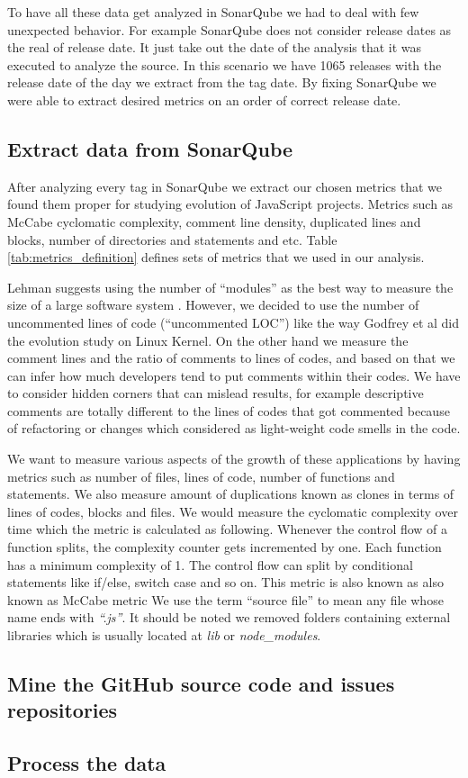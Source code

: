 To have all these data get analyzed in SonarQube we had to deal with few unexpected behavior. For example SonarQube does not consider release dates as the real of release date. It just take out the date of the analysis that it was executed to analyze the source. In this scenario we have 1065 releases with the release date of the day we extract from the tag date. By fixing SonarQube we were able to extract desired metrics on an order of correct release date.

\subsection{Extract data from SonarQube}

\par After analyzing every tag in SonarQube we extract our chosen metrics that we found them proper for studying evolution of JavaScript projects. Metrics such as McCabe cyclomatic complexity,  comment line density, duplicated lines and blocks, number of directories and statements and etc. Table  \ref{tab:metrics_definition} defines sets of metrics that we used in our analysis.

\par
Lehman suggests using the number of “modules” as the best way to measure the size of a large software system \cite{Lehman1997METRICS}. However, we decided to use the number of uncommented lines of code (“uncommented LOC”) like the way Godfrey et al \cite{Godfrey2000ICMS} did the evolution study on Linux Kernel. On the other hand we measure the comment lines and the ratio of comments to lines of codes, and based on that we can infer how much developers tend to put comments within their codes. We have to consider hidden corners that can mislead results, for example descriptive comments are totally different to the lines of codes that got commented because of refactoring or changes which considered as light-weight code smells in the code.

\par
We want to measure various aspects of the growth of these applications by having metrics such as number of files, lines of code, number of functions and statements. We also measure amount of duplications known as clones in terms of lines of codes, blocks and files. We would measure the cyclomatic complexity over time which the metric is calculated as following. Whenever the control flow of a function splits, the complexity counter gets incremented by one. Each function has a minimum complexity of 1. The control flow can split by conditional statements like if/else, switch case and so on. This metric is also known as also known as McCabe metric
We use the term “source file” to mean any file whose name ends with \textit{“.js”}. It should be noted we removed folders containing external libraries which is usually located at \textit{lib} or \textit{node\_modules}. 

\subsection{Mine the GitHub source code and issues repositories}

\subsection{Process the data}
